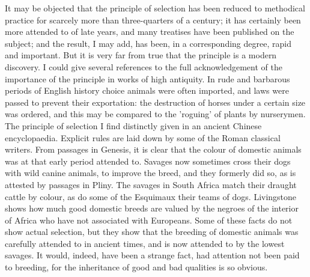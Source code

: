 \indent It may be objected that the principle of selection has been reduced to methodical practice for scarcely more than three-quarters of a century; it has certainly been more attended to of late years, and many treatises have been published on the subject; and the result, I may add, has been, in a corresponding degree, rapid and important. But it is very far from true that the principle is a modern discovery. I could give several references to the full acknowledgement of the importance of the principle in works of high antiquity. In rude and barbarous periods of English history choice animals were often imported, and laws were passed to prevent their exportation: the destruction of horses under a certain size was ordered, and this may be compared to the 'roguing' of plants by nurserymen.  The principle of selection I find distinctly given in an ancient Chinese encyclopaedia. Explicit rules are laid down by some of the Roman classical writers. From passages in Genesis, it is clear that the colour of domestic animals was at that early period attended to. Savages now sometimes cross their dogs with wild canine animals, to improve the breed, and they formerly did so, as is attested by passages in Pliny.  The savages in South Africa match their draught cattle by colour, as do some of the Esquimaux their teams of dogs. Livingstone shows how much good domestic breeds are valued by the negroes of the interior of Africa who have not associated with Europeans. Some of these facts do not show actual selection, but they show that the breeding of domestic animals was carefully attended to in ancient times, and is now attended to by the lowest savages. It would, indeed, have been a strange fact, had attention not been paid to breeding, for the inheritance of good and bad qualities is so obvious.  \\
